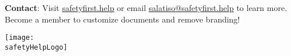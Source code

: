 \documentclass[11pt]{article}
\newcommand{\safetyHelpLogo}{/safety-plans/assets/images/logo.png}
\begin{document}
{  \textbf{Contact}: Visit \href{https://safetyfirst.help}{safetyfirst.help} or email \href{mailto:salatiso@safetyfirst.help}{salatiso@safetyfirst.help} to learn more. Become a member to customize documents and remove branding!

  \vspace{2cm}
  \hfill \texttt{[image: \\safetyHelpLogo]}
}{}

\label{LastPage}
\end{document}
